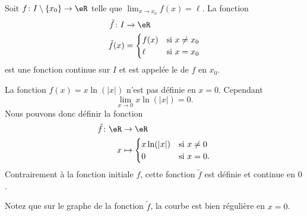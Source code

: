 \begin{definition}
    Soit \( f\colon I\setminus\{ x_0 \}\to \eR\) telle que \( \lim_{x\to x_{0}} f(x)=\ell\). La fonction
    \begin{equation}
        \begin{aligned}
            \tilde f\colon I&\to \eR \\
            \tilde f(x)&=\begin{cases}
                f(x)    &   \text{si \( x\neq x_0\)}\\
                \ell    &    \text{si \( x=x_0\)}
            \end{cases}
        \end{aligned}
    \end{equation}
    est une fonction continue sur \( I\) et est appelée le  de \( f\) en \( x_0\).
\end{definition}

\begin{example}
    La fonction \( f(x)=x\ln(|x|)\) n'est pas définie en \( x=0\). Cependant
    \begin{equation}
        \lim_{x\to 0} x\ln(|x|)=0.
    \end{equation}
    Nous pouvons donc définir la fonction
    \begin{equation}
        \begin{aligned}
            \tilde f\colon \eR&\to \eR \\
            x&\mapsto \begin{cases}
                x\ln(| x |)    &   \text{si \( x\neq 0\)}\\
                0    &    \text{si \( x=0\)}.
            \end{cases}
        \end{aligned}
    \end{equation}
    Contrairement à la fonction initiale \( f\), cette fonction \( \tilde f\) est définie et continue en \( 0\). 

    Notez que sur le graphe de la fonction \( \tilde f\), la courbe est bien régulière en \( x=0\).
    \begin{center}
       
    \end{center}

\end{example}

